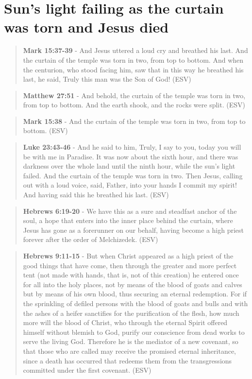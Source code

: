 \documentclass[11pt]{article}
\begin{document}
\section{Sun's light failing as the curtain was torn and Jesus died}
\label{sec:org8c6df1c}
\begin{quote}
\textbf{Mark 15:37-39} - And Jesus uttered a loud cry and breathed his last. And the curtain of the temple was torn in two, from top to bottom. And when the centurion, who stood facing him, saw that in this way he breathed his last, he said, Truly this man was the Son of God! (ESV)
\end{quote}

\begin{quote}
\textbf{Matthew 27:51} - And behold, the curtain of the temple was torn in two, from top to bottom. And the earth shook, and the rocks were split. (ESV)
\end{quote}

\begin{quote}
\textbf{Mark 15:38} - And the curtain of the temple was torn in two, from top to bottom. (ESV)
\end{quote}

\begin{quote}
\textbf{Luke 23:43-46} - And he said to him, Truly, I say to you, today you will be with me in Paradise. It was now about the sixth hour, and there was darkness over the whole land until the ninth hour, while the sun's light failed. And the curtain of the temple was torn in two. Then Jesus, calling out with a loud voice, said, Father, into your hands I commit my spirit! And having said this he breathed his last. (ESV)
\end{quote}

\begin{quote}
\textbf{Hebrews 6:19-20} - We have this as a sure and steadfast anchor of the soul, a hope that enters into the inner place behind the curtain, where Jesus has gone as a forerunner on our behalf, having become a high priest forever after the order of Melchizedek. (ESV)
\end{quote}

\begin{quote}
\textbf{Hebrews 9:11-15} - But when Christ appeared as a high priest of the good things that have come, then through the greater and more perfect tent (not made with hands, that is, not of this creation) he entered once for all into the holy places, not by means of the blood of goats and calves but by means of his own blood, thus securing an eternal redemption. For if the sprinkling of defiled persons with the blood of goats and bulls and with the ashes of a heifer sanctifies for the purification of the flesh, how much more will the blood of Christ, who through the eternal Spirit offered himself without blemish to God, purify our conscience from dead works to serve the living God. Therefore he is the mediator of a new covenant, so that those who are called may receive the promised eternal inheritance, since a death has occurred that redeems them from the transgressions committed under the first covenant. (ESV)
\end{quote}
\end{document}
